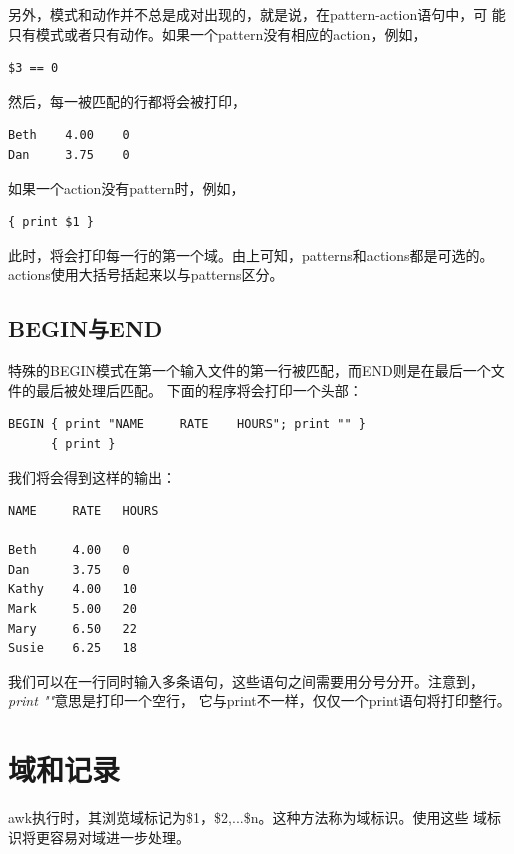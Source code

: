 另外，模式和动作并不总是成对出现的，就是说，在pattern-action语句中，可
能只有模式或者只有动作。如果一个pattern没有相应的action，例如，

\small{
\begin{verbatim}
$3 == 0
\end{verbatim}
}
\normalsize

然后，每一被匹配的行都将会被打印，

\small{
\begin{verbatim}
Beth    4.00    0
Dan     3.75    0
\end{verbatim}
}
\normalsize

如果一个action没有pattern时，例如，

\small{
\begin{verbatim}
{ print $1 }
\end{verbatim}
}
\normalsize

此时，将会打印每一行的第一个域。由上可知，patterns和actions都是可选的。
actions使用大括号括起来以与patterns区分。

\subsection{BEGIN与END}

特殊的BEGIN模式在第一个输入文件的第一行被匹配，而END则是在最后一个文件的最后被处理后匹配。
下面的程序将会打印一个头部：

\small{
\begin{verbatim}
BEGIN { print "NAME     RATE    HOURS"; print "" }
      { print }
\end{verbatim}
}
\normalsize

我们将会得到这样的输出：

\small{
\begin{verbatim}
NAME     RATE   HOURS

Beth     4.00   0
Dan      3.75   0
Kathy    4.00   10
Mark     5.00   20
Mary     6.50   22
Susie    6.25   18
\end{verbatim}
}
\normalsize

我们可以在一行同时输入多条语句，这些语句之间需要用分号分开。注意到，\textit{print ""}意思是打印一个空行，
它与print不一样，仅仅一个print语句将打印整行。

\section{域和记录}
\label{sec:FieldRecordAwk}

awk执行时，其浏览域标记为\$1，\$2,...\$n。这种方法称为域标识。使用这些
域标识将更容易对域进一步处理。

